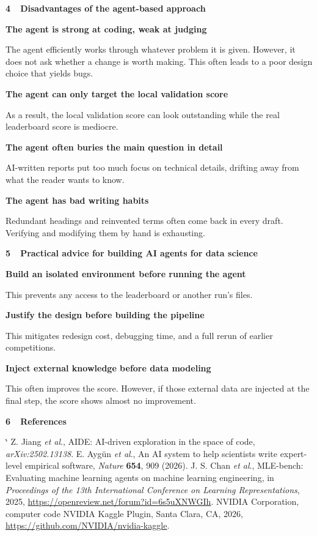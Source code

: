 \documentclass{article}
\makeatletter
\newcommand{\cardtitlesize}{\fontsize{40}{47}\selectfont}
\newcommand{\refsize}{\fontsize{26.5}{37.5}\selectfont}
\newcommand{\kb}[1]{\textbf{#1}}
\newcommand{\sep}{\ \textperiodcentered\ }
\newcommand{\blocktitle}[1]{%
  {\cardtitlesize\bfseries #1\par}%
  \vspace{-3.7mm}{\color{ruleline}\rule{\linewidth}{0.6mm}}\par\vspace{6mm}}
\newcommand{\pbul}{\textbf{\textbullet}\hspace{4mm}}
\newcommand{\pritem}[2]{%
  \pbul\kb{#1}\par\vspace{1mm}%
  \begingroup\leftskip=13mm\relax #2\par\endgroup\vspace{2.5mm}}
\newcommand{\etal}{\textit{et al}.}
\renewenvironment{thebibliography}[1]{%
  \list{\@biblabel{\@arabic\c@enumiv}}%
       {\settowidth\labelwidth{\@biblabel{#1}}%
        \leftmargin\labelwidth \advance\leftmargin\labelsep
        \setlength{\itemsep}{1.0mm}\setlength{\parsep}{0pt}%
        \setlength{\topsep}{0pt}\setlength{\partopsep}{0pt}%
        \usecounter{enumiv}%
        \let\p@enumiv\@empty \renewcommand\theenumiv{\@arabic\c@enumiv}}%
  \sloppy\clubpenalty4000 \@clubpenalty \clubpenalty \widowpenalty4000%
  \sfcode`\.\@m}
  {\def\@noitemerr{\@latex@warning{Empty `thebibliography' environment}}\endlist}
\makeatother
\begin{document}
\begin{minipage}[t]{429.15mm}
\begin{secblock}
\end{secblock}

\begin{secblock}
	\blocktitle{4\sep Disadvantages of the agent-based approach}
	\vspace{2mm}
	\pritem{The agent is strong at coding, weak at judging}{The agent efficiently works through whatever problem it is given. However, it does not ask whether a change is worth making. This often leads to a poor design choice that yields bugs.}
	\pritem{The agent can only target the local validation score}{As a result, the local validation score can look outstanding while the real leaderboard score is mediocre.}
	\pritem{The agent often buries the main question in detail}{AI-written reports put too much focus on technical details, drifting away from what the reader wants to know.}
	\pritem{The agent has bad writing habits}{Redundant headings and reinvented terms often come back in every draft. Verifying and modifying them by hand is exhausting.}
	\end{secblock}

\begin{secblock}
\blocktitle{5\sep Practical advice for building AI agents for data science}
\vspace{2mm}
\pritem{Build an isolated environment before running the agent}{This prevents any access to the leaderboard or another run's files.}
\pritem{Justify the design before building the pipeline}{This mitigates redesign cost, debugging time, and a full rerun of earlier competitions.}
\pritem{Inject external knowledge before data modeling}{This often improves the score. However, if those external data are injected at the final step, the score shows almost no improvement.}
\end{secblock}



\begin{secblock}
\blocktitle{6\sep References}
{\refsize
\begin{thebibliography}{9}
 Z. Jiang \etal, AIDE: AI-driven exploration in the space
  of code, \emph{arXiv:2502.13138}.
 E. Ayg\"un \etal, An AI system to help scientists write
  expert-level empirical software, \emph{Nature} \textbf{654}, 909 (2026).
 J. S. Chan \etal, MLE-bench: Evaluating machine learning
  agents on machine learning engineering, in \emph{Proceedings of the 13th
  International Conference on Learning Representations}, 2025,
  \url{https://openreview.net/forum?id=6s5uXNWGIh}.
 NVIDIA Corporation, computer code NVIDIA Kaggle Plugin,
  Santa Clara, CA, 2026, \url{https://github.com/NVIDIA/nvidia-kaggle}.
\end{thebibliography}\par}
\end{secblock}

\end{minipage}
\end{document}
